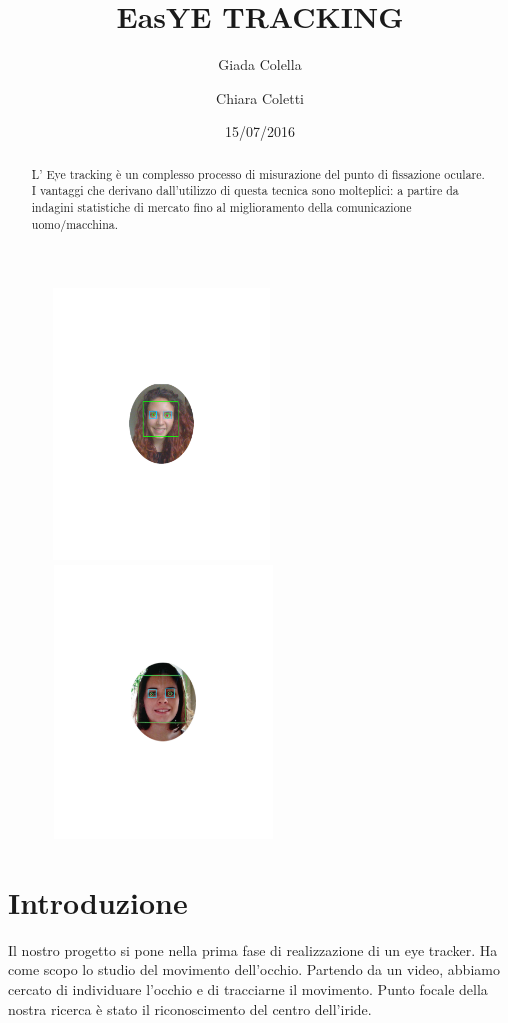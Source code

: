 \documentclass[12pt]{article}
\title{\textbf{EasYE TRACKING}}
\author{Giada Colella \and Chiara Coletti}
\date{15/07/2016}
\begin{document}
	

\begin{figure}
\centering
\includegraphics[width=6cm,height=7.2cm]{im2}%
\qquad\qquad
\includegraphics[width=6.1cm,height=7.25cm]{im}
\end{figure}

\maketitle
\pagebreak

\tableofcontents

\pagebreak

\begin{abstract}
	L' Eye tracking \`e un complesso processo di misurazione del punto di fissazione oculare. I vantaggi che derivano dall'utilizzo di questa tecnica sono molteplici: a partire da indagini statistiche di mercato fino al miglioramento della comunicazione uomo/macchina.
\end{abstract}
\pagebreak
\section{Introduzione}
Il nostro progetto si pone nella prima fase di realizzazione di un eye tracker. Ha come scopo lo studio del movimento dell'occhio. Partendo da un video, abbiamo cercato di individuare l'occhio e di tracciarne il movimento. Punto focale della nostra ricerca \`e stato il riconoscimento del centro dell'iride. 
\end{document}
